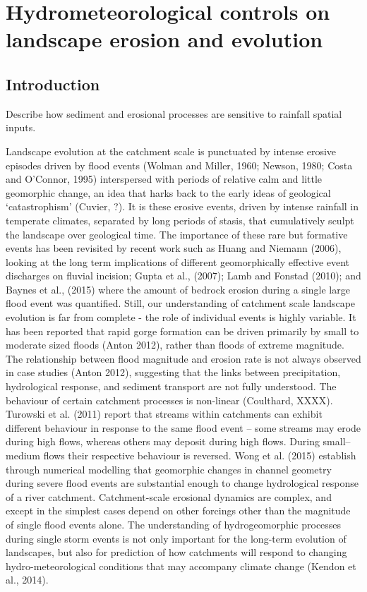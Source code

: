 \chapter{Hydrometeorological controls on landscape erosion and evolution}
\label{chapter_landscape_evol}

\section{Introduction}

Describe how sediment and erosional processes are sensitive to rainfall spatial inputs.

Landscape evolution at the catchment scale is punctuated by intense erosive episodes driven by flood events (Wolman and Miller, 1960; Newson, 1980; Costa and O'Connor, 1995) interspersed with periods of relative calm and little geomorphic change, an idea that harks back to the early ideas of geological `catastrophism' (Cuvier, ?). It is these erosive events, driven by intense rainfall in temperate climates, separated by long periods of stasis, that cumulatively sculpt the landscape over geological time. The importance of these rare but formative events has been revisited by recent work such as Huang and Niemann (2006), looking at the long term implications of different geomorphically effective event discharges on fluvial incision; Gupta et al., (2007); Lamb and Fonstad (2010); and Baynes et al., (2015) where the amount of bedrock erosion during a single large flood event was quantified. Still, our understanding of catchment scale landscape evolution is far from complete - the role of individual events is highly variable. It has been reported that rapid gorge formation can be driven primarily by small to moderate sized floods (Anton 2012), rather than floods of extreme magnitude. The relationship between flood magnitude and erosion rate is not always observed in case studies (Anton 2012), suggesting that the links between precipitation, hydrological response, and sediment transport are not fully understood. The behaviour of certain catchment processes is non-linear (Coulthard, XXXX). Turowski et al. (2011) report that streams within catchments can exhibit different behaviour in response to the same flood event -- some streams may erode during high flows, whereas others may deposit during high flows. During small--medium flows their respective behaviour is reversed. Wong et al. (2015) establish through numerical modelling that geomorphic changes in channel geometry during severe flood events are substantial enough to change hydrological response of a river catchment. Catchment-scale erosional dynamics are complex, and except in the simplest cases depend on other forcings other than the magnitude of single flood events alone.  The understanding of hydrogeomorphic processes during single storm events is not only important for the long-term evolution of landscapes, but also for prediction of how catchments will respond to changing hydro-meteorological conditions that may accompany climate change (Kendon et al., 2014).

